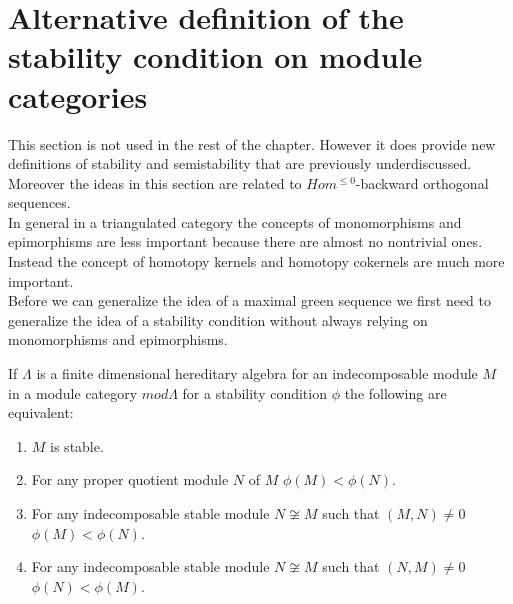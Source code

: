 \section{Alternative definition of the stability condition on module categories}
\indent This section is not used in the rest of the chapter. However it does provide new definitions of stability and semistability that are previously underdiscussed. Moreover the ideas in this section are related to $Hom^{\leq 0}$-backward orthogonal sequences.\\
\indent In general in a triangulated category the concepts of monomorphisms and epimorphisms are less important because there are almost no nontrivial ones. Instead the concept of homotopy kernels and homotopy cokernels are much more important.\\
\indent Before we can generalize the idea of a maximal green sequence we first need to generalize the idea of a stability condition without always relying on monomorphisms and epimorphisms.\\
\begin{theorem}
If $\Lambda$ is a finite dimensional hereditary algebra for an indecomposable module $M$ in a module category $mod \Lambda$ for a stability condition $\phi$ the following are equivalent:
\begin{enumerate}
\item $M$ is stable.
\item For any proper quotient module $N$ of $M$ $\phi(M)<\phi(N)$.
\item For any indecomposable stable module $N\not\cong M$ such that $(M,N)\neq 0$ $\phi(M)<\phi(N)$.
\item For any indecomposable stable module $N\not\cong M$ such that $(N,M)\neq 0$ $\phi(N)<\phi(M)$.
\end{enumerate}
\end{theorem}

